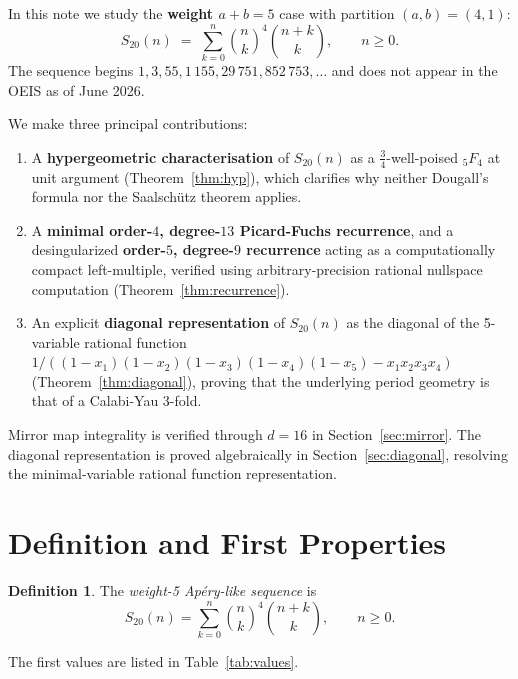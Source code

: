 \documentclass[12pt,reqno]{amsart}
\theoremstyle{plain}
\theoremstyle{definition}
\newtheorem{definition}[theorem]{Definition}
\theoremstyle{remark}
\newcommand{\pFq}[2]{{}_{#1}F_{#2}}
\begin{document}
In this note we study the \textbf{weight $a + b = 5$} case
with partition $(a,b) = (4,1)$:
\begin{equation}\label{eq:S20def}
S_{20}(n) \;=\; \sum_{k=0}^{n} \binom{n}{k}^{\!4}\binom{n+k}{k},
\qquad n \ge 0.
\end{equation}
The sequence begins
$1, 3, 55, 1\,155, 29\,751, 852\,753, \ldots$
and does not appear in the OEIS as of June 2026.

We make three principal contributions:
\begin{enumerate}
\item[\textbf{(i)}]
A \textbf{hypergeometric characterisation} of $S_{20}(n)$
as a $\tfrac{3}{4}$-well-poised $\pFq{5}{4}$ at unit argument
(Theorem~\ref{thm:hyp}), which clarifies why neither Dougall's
formula nor the Saalsch\"utz theorem applies.
\item[\textbf{(ii)}]
A \textbf{minimal order-$4$, degree-$13$ Picard-Fuchs recurrence},
and a desingularized \textbf{order-$5$, degree-$9$ recurrence} acting as a
computationally compact left-multiple, verified using arbitrary-precision rational nullspace computation (Theorem~\ref{thm:recurrence}).
\item[\textbf{(iii)}]
An explicit \textbf{diagonal representation} of $S_{20}(n)$ as the diagonal of the 5-variable rational function $1 / ((1-x_1)(1-x_2)(1-x_3)(1-x_4)(1-x_5) - x_1 x_2 x_3 x_4)$ (Theorem~\ref{thm:diagonal}), proving that the underlying period geometry is that of a Calabi-Yau 3-fold.
\end{enumerate}

Mirror map integrality is verified through $d = 16$ in Section~\ref{sec:mirror}.
The diagonal representation is proved algebraically in Section~\ref{sec:diagonal}, resolving the minimal-variable rational function representation.


\section{Definition and First Properties}\label{sec:def}

\begin{definition}\label{def:S20}
The \emph{weight-5 Apéry-like sequence} is
\[
S_{20}(n) = \sum_{k=0}^{n} \binom{n}{k}^{\!4}\binom{n+k}{k},
\qquad n \ge 0.
\]
\end{definition}

\noindent
The first values are listed in Table~\ref{tab:values}.
\end{document}
